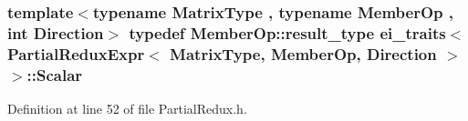 \hypertarget{structei__traits_3_01_partial_redux_expr_3_01_matrix_type_00_01_member_op_00_01_direction_01_4_01_4_a283ef4c36b09a8e93ae1b83386792f8f}{
\subsubsection[{Scalar}]{\setlength{\rightskip}{0pt plus 5cm}template$<$typename Matrix\-Type , typename Member\-Op , int Direction$>$ typedef Member\-Op\-::result\-\_\-type {\bf ei\-\_\-traits}$<$ {\bf Partial\-Redux\-Expr}$<$ Matrix\-Type, Member\-Op, Direction $>$ $>$\-::{\bf Scalar}}}\label{structei__traits_3_01_partial_redux_expr_3_01_matrix_type_00_01_member_op_00_01_direction_01_4_01_4_a283ef4c36b09a8e93ae1b83386792f8f}


Definition at line 52 of file Partial\-Redux.\-h.



